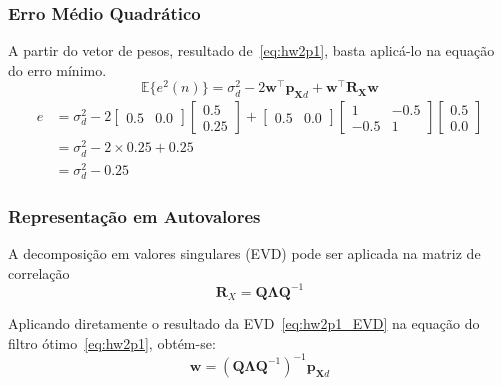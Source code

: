 \subsubsection*{Erro Médio Quadrático}

A partir do vetor de pesos, resultado de~\ref{eq:hw2p1}, basta aplicá-lo na equação do erro mínimo.
\begin{equation}
    \mathbb{E}\{e^{2}(n)\}  =\sigma^{2}_{d} - 2\mathbf{w}^{\top}\mathbf{p}_{\mathbf{X} d} + \mathbf{w}^{\top} \mathbf{R_{X}} \mathbf{w}      
\end{equation}
\begin{align*}
     e &= \sigma^{2}_{d} - 2 \left[ \begin{matrix} 0.5 & 0.0 \end{matrix} \right] \left[ \begin{matrix} 0.5 \\ 0.25 \end{matrix} \right] + \left[ \begin{matrix} 0.5 & 0.0 \end{matrix} \right] \left[ \begin{matrix} 1 & -0.5 \\ -0.5 & 1 \end{matrix} \right]  \left[ \begin{matrix} 0.5  \\ 0.0 \end{matrix} \right] \\
     &= \sigma^{2}_{d} - 2 \times 0.25 + 0.25 \\
     &= \sigma^{2}_{d} - 0.25
\end{align*}


\subsubsection*{Representação em Autovalores}
A decomposição em valores singulares (EVD) pode ser aplicada na matriz de correlação
\begin{equation}
    \mathbf{R}_{X} = \mathbf{Q} \mathbf{\Lambda} \mathbf{Q}^{-1} \label{eq:hw2p1_EVD}
\end{equation}


Aplicando diretamente o resultado da EVD~\ref{eq:hw2p1_EVD} na equação do filtro ótimo~\ref{eq:hw2p1}, obtém-se:
\begin{equation}
    \mathbf{w}= (\mathbf{Q} \mathbf{\Lambda} \mathbf{Q}^{-1})^{-1} \mathbf{p}_{\mathbf{X} d}
\end{equation}

